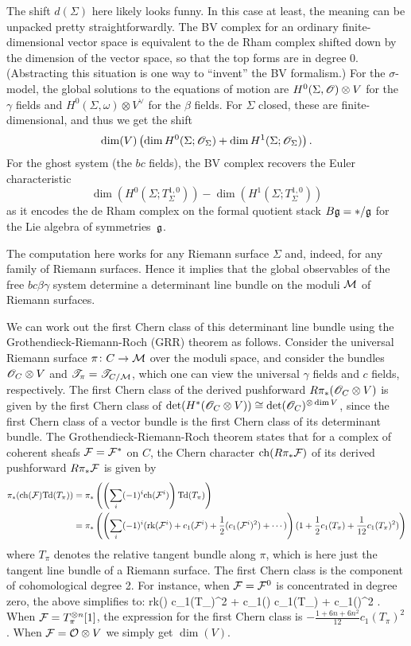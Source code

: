 \begin{rmk}
The shift $d(\Sigma)$ here likely looks funny.
In this case at least, the meaning can be unpacked pretty straightforwardly. 
The BV complex for an ordinary finite-dimensional vector space is equivalent to the de Rham complex shifted down by the dimension of the vector space, 
so that the top forms are in degree 0.
(Abstracting this situation is one way to ``invent'' the BV formalism.)
For the $\sigma$-model, the global solutions to the equations of motion are $H^0(\Sigma,\mathscr O) \otimes V$ for the $\gamma$ fields and $H^0(\Sigma,\omega) \otimes V^\vee$ for the $\beta$ fields.
For $\Sigma$ closed, these are finite-dimensional, and thus we get the shift
\[
 \dim (V)  \left(\dim H^0(\Sigma ; \mathscr O_\Sigma) + \dim H^1(\Sigma ; \mathscr O_\Sigma)\right).
\]
For the ghost system (the $bc$ fields), 
the BV complex recovers the Euler characteristic 
\[
\dim(H^0(\Sigma ; T_\Sigma^{1,0})) - \dim(H^1(\Sigma ; T_\Sigma^{1,0}))
\]
as it encodes the de Rham complex on the formal quotient stack $B\mathfrak g = \ast/\mathfrak g$ for the Lie algebra of symmetries~$\mathfrak g$.
\end{rmk}

The computation here works for any Riemann surface $\Sigma$ and, indeed, for any family of Riemann surfaces.
Hence it implies that the global observables of the free $bc\beta\gamma$ system determine a determinant line bundle on the moduli $\mathcal M$ of Riemann surfaces.

We can work out the first Chern class of this determinant line bundle using the Grothendieck-Riemann-Roch (GRR) theorem as follows.
Consider the universal Riemann surface $\pi \colon C \to \mathcal M$ over the moduli space, 
and consider the bundles $\mathscr O_C \otimes V$ and $\mathscr T_\pi = \mathscr T_{C/\mathcal M}$,
which one can view the universal $\gamma$ fields and $c$ fields, respectively.
The first Chern class of the derived pushforward $R\pi_*(\mathscr O_C \otimes V)$ is given by the first Chern class of $\det(H^*(\mathscr O_C \otimes V)) \cong \det(\mathscr O_C)^{\otimes \dim V}$, 
since the first Chern class of a vector bundle is the first Chern class of its determinant bundle.
The Grothendieck-Riemann-Roch theorem states that for a complex of coherent sheafs $\mathcal F = \mathcal F^*$ on $C$, 
the Chern character ${\rm ch}(R\pi_* \mathcal F)$ of its derived pushforward $R\pi_* \mathcal F$  is given by 
\def\Td{{\rm Td}}
\begin{align*}
\pi_*( \ch(\cF) \Td(T_\pi)) &= \pi_*\left( \left(\sum_{i} (-1)^i \ch (\cF^i) \right) \Td(T_\pi)\right) \\
&= \pi_*\left( \left(\sum_i (-1)^i ({\rm rk}(\cF^i) + c_1(\cF^i) + \frac{1}{2}(c_1(\cF^i)^2) + \cdots)\right) (1 +\frac{1}{2}c_1(T_\pi) + \frac{1}{12} c_1(T_\pi)^2)\right)
\end{align*}
where $T_\pi$ denotes the relative tangent bundle along $\pi$,
which is here just the tangent line bundle of a Riemann surface.
The first Chern class is the component of cohomological degree 2.
For instance, when $\mathcal F = \mathcal F^0$ is concentrated in degree zero, the above simplifies to:
\ben
{} {\rm rk}(\cF) c_1(T_\pi)^2 +  c_1(\cF) c_1(T_\pi) +  c_1(\cF)^2 .
\een  
When $\mathcal F = T^{\otimes n}_{\pi} [1]$, the expression for the first Chern class is $-\frac{1 + 6n + 6n^2}{12} c_1(T_\pi)^2$.
When $\mathcal F = \mathcal O \otimes V$ we simply get $\dim(V)$. 

